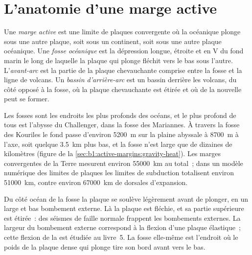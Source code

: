 \section{L'anatomie d'une marge active}\label{sec:b1:active-margins:anatomy}

\begin{definition}\label{def:b1:active-margins:active-margin}
Une \emph{marge active} est une limite de plaques convergente où
la  océanique plonge sous une autre plaque, soit sous un
continent, soit sous une autre plaque océanique. Une \emph{fosse
océanique} est la dépression longue, étroite et en V du
fond marin le long de laquelle la plaque qui plonge fléchit vers le bas sous l'autre.
L'\emph{avant-arc} est la partie de la plaque chevauchante comprise entre la
fosse et la ligne de volcans. Un \emph{bassin d'arrière-arc}
est un bassin derrière les volcans, du côté opposé à la fosse, où la
plaque chevauchante est étirée et où de la nouvelle  peut se former.
\end{definition}

Les fosses sont les endroits les plus profonds des océans, et le plus profond de tous est
l'abysse du Challenger, dans la fosse des Mariannes. À travers la fosse des Kouriles le fond passe
d'environ \qty{5200}{m} sur la plaine abyssale à \qty{8700}{m} à l'axe,
soit quelque \qty{3.5}{km} plus bas, et la fosse n'est large que de dizaines de kilomètres
(figure de la \cref{sec:b1:active-margins:gravity-heat}). Les marges convergentes
de la Terre mesurent environ \qty{55000}{km} au total~; dans un modèle numérique des
limites de plaques les limites de subduction totalisent environ \qty{51000}{km},
contre environ \qty{67000}{km} de dorsales d'expansion.

Du côté océan de la fosse la plaque se soulève légèrement avant de plonger, en un large et
bas bombement externe. Là la plaque est fléchie, et sa partie supérieure est étirée~:
des séismes de faille normale frappent les bombements externes. La largeur du bombement externe
correspond à la flexion d'une plaque élastique~; cette flexion de la 
est étudiée au livre~5. La fosse elle-même est l'endroit où le poids de la
plaque dense qui plonge tire son bord avant vers le bas.

